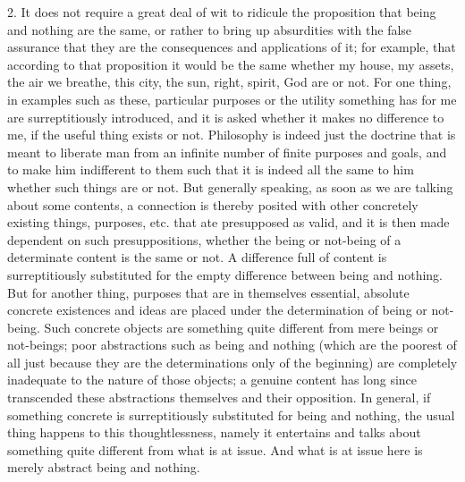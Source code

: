    2. It does not require a great deal of wit to ridicule
    the proposition that being and nothing are the same,
    or rather to bring up absurdities with the false assurance
    that they are the consequences and applications of it;
    for example, that according to that proposition
    it would be the same whether my house, my assets,
    the air we breathe, this city, the sun,
    right, spirit, God are or not.
    For one thing, in examples such as these, particular purposes
    or the utility something has for me are surreptitiously introduced,
    and it is asked whether it makes no difference to me,
    if the useful thing exists or not.
    Philosophy is indeed just the doctrine that is meant
    to liberate man from an infinite number of finite purposes and goals,
    and to make him indifferent to them such that it is indeed
    all the same to him whether such things are or not.
    But generally speaking, as soon as we are talking about some contents,
    a connection is thereby posited with other concretely existing things,
    purposes, etc. that ate presupposed as valid, and
    it is then made dependent on such presuppositions,
    whether the being or not-being of a determinate content is
    the same or not.
    A difference full of content is surreptitiously substituted for the
    empty difference between being and nothing.
    But for another thing, purposes that are in themselves
    essential, absolute concrete existences and ideas are
    placed under the determination of being or not-being.
    Such concrete objects are something quite different
    from mere beings or not-beings;
    poor abstractions such as being and nothing
    (which are the poorest of all just because
    they are the determinations only of the beginning)
    are completely inadequate to the nature of those objects;
    a genuine content has long since transcended
    these abstractions themselves and their opposition.
    In general, if something concrete is surreptitiously substituted
    for being and nothing, the usual thing happens to this thoughtlessness,
    namely it entertains and talks about something
    quite different from what is at issue.
    And what is at issue here is merely abstract being and nothing.

